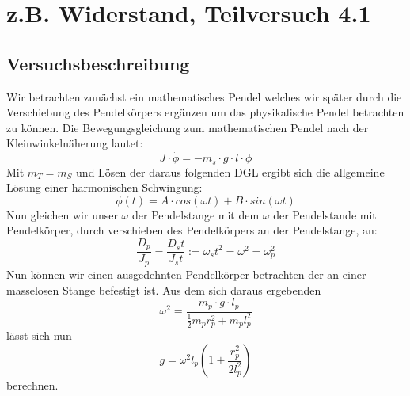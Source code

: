 \documentclass[12pt,a4paper]{article}
\author{Gruppe C14 \\ Julián Häck, Martin Koytek, Lars Wenning, Erik Zimmermann}
\begin{document}
\section{z.B. Widerstand, Teilversuch 4.1}
\subsection{Versuchsbeschreibung}
Wir betrachten zunächst ein mathematisches Pendel welches wir später durch die Verschiebung des Pendelkörpers ergänzen um das physikalische Pendel betrachten zu können.
Die Bewegungsgleichung zum mathematischen Pendel nach der Kleinwinkelnäherung lautet:
\begin{equation*}
J \cdot \ddot{\phi} = -m_s \cdot g \cdot l \cdot \phi 
\end{equation*}
Mit $m_T=m_S$ und Lösen der daraus folgenden DGL ergibt sich die allgemeine Lösung einer harmonischen Schwingung:
\begin{equation*}
\phi(t)=A\cdot cos(\omega t) + B \cdot sin(\omega t)
\end{equation*}
Nun gleichen wir unser $\omega$ der Pendelstange mit dem $\omega$ der Pendelstande mit Pendelkörper, durch verschieben des Pendelkörpers an der Pendelstange, an:
\begin{equation*}
\frac{D_p}{J_p}=\frac{D_st}{J_st}:=\omega_st^2=\omega^2=\omega_p^2
\end{equation*}
Nun können wir einen ausgedehnten Pendelkörper betrachten der an einer masselosen Stange befestigt ist.
Aus dem sich daraus ergebenden
\begin{equation*}
\omega^2=\frac{m_p \cdot g \cdot l_p}{\frac{1}{2}m_p r_p^2+m_pl_p^2}
\end{equation*}
lässt sich nun
\begin{equation*}
g=\omega^2 l_p (1+\frac{r_p^2}{2 l_p^2})
\end{equation*} 
berechnen.
\newpage
\end{document}
